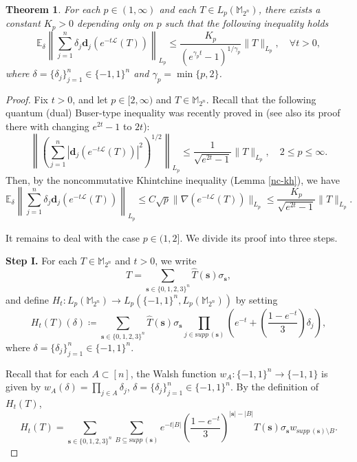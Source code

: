 \documentclass{amsbook}
\newtheorem{theorem}{Theorem}[chapter]
\theoremstyle{definition}
\theoremstyle{remark}
\numberwithin{section}{chapter}
\numberwithin{equation}{chapter}
\newcommand{\M}{\mathbb{M}}
\newcommand{\1}{\mathbf{1}}
\newcommand{\s}{\mathbf{s}}
\newcommand{\dc}{\mathbf{d}}
\newcommand{\supp}{{\mathrm supp}\,}
\begin{document}
\begin{theorem}\label{gradient estimate1}
For each $p\in(1,\infty)$ and each $T\in L_{p}(\mathbb{M}_{2^n})$, there exists a constant $K_{p}>0$ depending only on $p$ such that  the following inequality holds
\begin{equation}\label{gradient estimate1-con}
\mathbb{E}_{\delta}\left\|\sum_{j=1}^{n}\delta_{j}\dc_{j}(e^{-t\mathcal{L}}(T))\right\|_{L_{p}}\leq
\frac{K_{p}}{(e^{\gamma_pt}-1)^{1/{\gamma_p}}}\|T\|_{L_{p}},\quad \forall t>0,
\end{equation}
where $\delta=\{\delta_{j}\}_{j=1}^{n}\in \{-1,1\}^n$ and  $\gamma_p=\min\{p,2\}$.
\end{theorem}
\begin{proof} Fix $t>0$,
and let $p\in [2,\infty)$ and $T\in\mathbb{M}_{2^n}$.	Recall that the following quantum (dual) Buser-type inequality was recently proved in \cite[Lemma 5.6]{JLLZ2025} (see also its proof there with changing $e^{2t}-1$ to $2t$):
\begin{equation}\label{Q-Buser}
\left\|\left(\sum_{j=1}^{n}|\dc_{j}(e^{-t\mathcal{L}}(T))|^2\right)^{1/2}\right\|_{L_p}\leq \frac{1}{\sqrt{e^{2t}-1}}\|T\|_{L_p}, \quad 2\leq p\leq\infty.
\end{equation}
Then, by the noncommutative Khintchine inequality (Lemma \ref{nc-kh}), we have
\begin{equation}\label{Byser}
\mathbb{E}_{\delta}\left\|\sum_{j=1}^{n}\delta_{j}\dc_{j}(e^{-t\mathcal{L}}(T))\right\|_{L_{p}}\leq C\sqrt{p}\|\nabla(e^{-t\mathcal{L}}(T))\|_{L_{p}}\leq \frac{K_p}{\sqrt{e^{2t}-1}}\|T\|_{L_{p}}.
\end{equation}	

It remains to deal with the case $p\in(1,2]$. We divide its proof into three steps.

{\bf Step I.} For each $T\in \M_{2^{n}}$ and $t>0$, we write
\[
T=\sum_{\s\in\{0,1,2,3\}^{n}}\widehat{T}(\s)\sigma_{\s},
\]
and define $H_t: L_p(\mathbb{M}_{2^n})\to L_p(\{-1,1\}^n, L_p(\mathbb{M}_{2^n}))$ by setting
\begin{equation}
H_{t}(T)(\delta)\coloneqq \sum_{\s\in\{0,1,2,3\}^{n}}\widehat{T}(\s)\sigma_{\s}\prod_{j\in \supp(\s)}(e^{-t}+(\frac{1-e^{-t}}3)\delta_{j}),
\end{equation}
where $\delta=\{\delta_{j}\}_{j=1}^{n}\in \{-1,1\}^n$.

 Recall that for each $A\subset [n]$, the Walsh function $w_A:\{-1,1\}^n\to \{-1,1\}$ is given by $w_A(\delta)=\prod_{j\in A}\delta_j$, $\delta=\{\delta_{j}\}_{j=1}^{n}\in \{-1,1\}^n$. By the definition of $H_{t}(T)$,
\begin{equation}\label{basic formula 1}
H_{t}(T)=\sum_{\s\in\{0,1,2,3\}^{n}}\sum_{B\subseteq \supp(\s)}e^{-t|B|}(\frac{1-e^{-t}}3)^{|\s|-|B|}\widehat{T}(\s)\sigma_{\s} w_{\supp(\s)\setminus B}.
\end{equation}



\end{proof}
\end{document}
